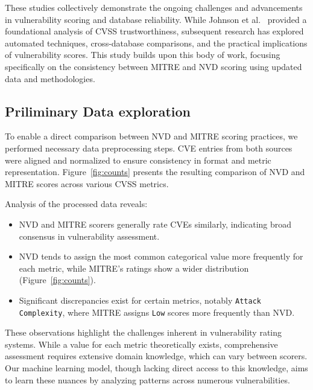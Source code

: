 \documentclass[12pt]{article}
\begin{document}
These studies collectively demonstrate the ongoing challenges and advancements in vulnerability
scoring and database reliability. While Johnson et al.~\cite{bayes} provided a foundational analysis
of CVSS trustworthiness, subsequent research has explored automated techniques, cross-database
comparisons, and the practical implications of vulnerability scores. This study builds upon
this body of work, focusing specifically on the consistency between MITRE and NVD scoring using
updated data and methodologies.

\subsection{Priliminary Data exploration}

To enable a direct comparison between NVD and MITRE scoring practices, we performed necessary data
preprocessing steps. CVE entries from both sources were aligned and normalized to ensure consistency
in format and metric representation. Figure~\ref{fig:counts} presents the resulting comparison of
NVD and MITRE scores across various CVSS metrics.

Analysis of the processed data reveals:

\begin{itemize}

	\item NVD and MITRE scorers generally rate CVEs similarly, indicating broad consensus in
	      vulnerability assessment.

	\item NVD tends to assign the most common categorical value more frequently for each metric,
	      while MITRE's ratings show a wider distribution (Figure~\ref{fig:counts}).

	\item Significant discrepancies exist for certain metrics, notably \texttt{Attack Complexity},
	      where MITRE assigns \texttt{Low} scores more frequently than NVD.

\end{itemize}

These observations highlight the challenges inherent in vulnerability rating systems. While a 
value for each metric theoretically exists, comprehensive assessment requires extensive domain
knowledge, which can vary between scorers. Our machine learning model, though lacking direct access
to this knowledge, aims to learn these nuances by analyzing patterns across numerous
vulnerabilities.
\end{document}
